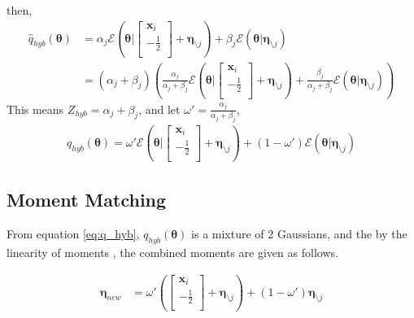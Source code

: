 \documentclass[a4]{article}
\begin{document}
then,
\begin{equation}
\begin{aligned}
\hat{q}_{hyb}(\bm{\theta})
&=
\alpha_j
\mathcal{E}\left(\bm{\theta}| \begin{bmatrix}\bm{x}_i\\-\frac{1}{2}\\\end{bmatrix} + \bm{\eta}_{\setminus j}\right)
+
\beta_j\mathcal{E}(\bm{\theta}|\bm{\eta}_{\setminus j})\\
&=
(\alpha_j + \beta_j)
\left(
\frac{\alpha_j}{\alpha_j + \beta_j}
\mathcal{E}\left(\bm{\theta}| \begin{bmatrix}\bm{x}_i\\-\frac{1}{2}\\\end{bmatrix} + \bm{\eta}_{\setminus j}\right)
+
\frac{\beta_j}{\alpha_j + \beta_j}\mathcal{E}(\bm{\theta}|\bm{\eta}_{\setminus j})
\right)
\end{aligned}
\end{equation}
This means $Z_{hyb} = \alpha_j + \beta_j$, and let $\omega' = \frac{\alpha_j}{\alpha_j + \beta_j}$, 
\begin{equation}
\begin{aligned}
q_{hyb}(\bm{\theta}) = 
\omega'
\mathcal{E}\left(\bm{\theta}| \begin{bmatrix}\bm{x}_i\\-\frac{1}{2}\\\end{bmatrix} + \bm{\eta}_{\setminus j}\right)
+
(1 - \omega')
\mathcal{E}(\bm{\theta}|\bm{\eta}_{\setminus j})\label{eq:q_hyb}
\end{aligned}
\end{equation}


\subsection {Moment Matching}
From equation \ref{eq:q_hyb},  $q_{hyb}(\bm{\theta})$ is a mixture of 2 Gaussians, and the by the linearity
of moments \cite{moments_gaussian_mixture}, the combined moments are given as follows.

\begin{equation}
\begin{aligned}
\bm{\eta}_{new} &= 
\omega'\left(\begin{bmatrix}\bm{x}_i\\-\frac{1}{2}\\\end{bmatrix} + \bm{\eta}_{\setminus j}\right) + 
(1 - \omega')\bm{\eta}_{\setminus j}
\end{aligned}
\end{equation}
\end{document}
